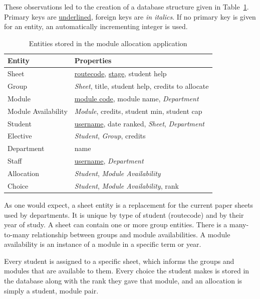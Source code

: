 These observations led to the creation of a database structure given in
Table~\ref{development_database_schema}. Primary keys are
\underline{underlined}, foreign keys are \emph{in italics}. If no primary key
is given for an entity, an automatically incrementing integer is used.

\begin{table}
  \begin{center}
    \begin{tabular}{ | l | l | }
      \hline
      \textbf{Entity} & \textbf{Properties} \\
      \hline
      Sheet & \underline{\gls{routecode}}, \underline{\gls{stage}}, student help \\
      Group & \emph{Sheet}, title, student help, credits to allocate \\
      Module & \underline{module code}, module name, \emph{Department} \\
      Module Availability & \emph{Module}, credits, student min, student cap \\
      Student & \underline{username}, date ranked, \emph{Sheet}, \emph{Department} \\
      Elective & \emph{Student}, \emph{Group}, credits \\
      Department & name \\
      Staff & \underline{username}, \emph{Department} \\
      Allocation & \emph{Student}, \emph{Module Availability} \\
      Choice & \emph{Student}, \emph{Module Availability}, rank \\
      \hline
    \end{tabular}
  \end{center}
  \caption{Entities stored in the module allocation application}
  \label{development_database_schema}
\end{table}

As one would expect, a sheet entity is a replacement for the current paper
sheets used by departments. It is unique by type of student (\gls{routecode})
and by their year of study. A sheet can contain one or more group entities.
There is a many-to-many relationship between groups and module availabilities.
A module availability is an instance of a module in a specific term or year.

Every student is assigned to a specific sheet, which informs the groups and
modules that are available to them. Every choice the student makes is stored
in the database along with the rank they gave that module, and an allocation
is simply a student, module pair.

